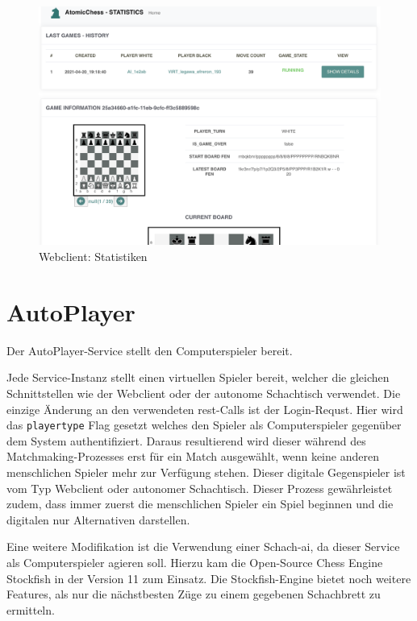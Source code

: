 \begin{figure}
\centering
\includegraphics{images/ATC_statistics.png}
\caption{Webclient: Statistiken \label{ATC_statistics}}
\end{figure}

\hypertarget{autoplayer}{%
\section{AutoPlayer}\label{autoplayer}}

Der AutoPlayer-Service stellt den Computerspieler bereit.

Jede Service-Instanz stellt einen virtuellen Spieler bereit, welcher die
gleichen Schnittstellen wie der Webclient oder der autonome Schachtisch
verwendet. Die einzige Änderung an den verwendeten \gls{rest}-Calls ist
der Login-Requst. Hier wird das \passthrough{\lstinline!playertype!}
Flag gesetzt welches den Spieler als Computerspieler gegenüber dem
System authentifiziert. Daraus resultierend wird dieser während des
Matchmaking-Prozesses erst für ein Match ausgewählt, wenn keine anderen
menschlichen Spieler mehr zur Verfügung stehen. Dieser digitale
Gegenspieler ist vom Typ Webclient oder autonomer Schachtisch. Dieser
Prozess gewährleistet zudem, dass immer zuerst die menschlichen Spieler
ein Spiel beginnen und die digitalen nur Alternativen darstellen.

Eine weitere Modifikation ist die Verwendung einer Schach-\gls{ai}, da
dieser Service als Computerspieler agieren soll. Hierzu kam die
Open-Source Chess Engine Stockfish\cite{stockfish} in der Version 11
zum Einsatz. Die Stockfish-Engine bietet noch weitere Features, als nur
die nächstbesten Züge zu einem gegebenen Schachbrett zu ermitteln.

